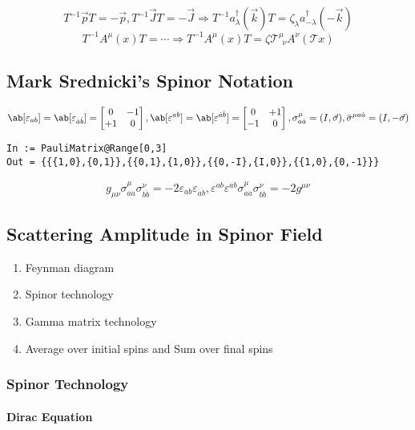 \documentclass{article}
\newcommand{\bmat}[1]{\begin{bmatrix}#1\end{bmatrix}}
\newcommand{\calT}{\mathcal{T}}
\newcommand{\veck}{\vec{k}}
\newcommand{\vecp}{\vec{p}}
\begin{document}
\[ T^{-1} \vecp T = - \vecp, T^{-1} \vec{J} T = - \vec{J} \Rightarrow T^{-1} a_\lambda^{\dagger}(\veck) T = \zeta_{\lambda} a_{- \lambda}^{\dagger}(- \veck) \]
\[ T^{-1} A^{\mu}(x) T = \cdots \Rightarrow T^{-1} A^{\mu}(x) T = \zeta \calT^{\mu}_{\ \ \nu} A^{\nu}(\calT x) \]

\subsection{Mark Srednicki's Spinor Notation}

\[ \ab[\varepsilon_{ab}] = \ab[\varepsilon_{\dot{a} \dot{b}}] = \bmat{0 & -1 \\ +1 & 0}, \ab[\varepsilon^{ab}] = \ab[\varepsilon^{\dot{a} \dot{b}}] = \bmat{0 & +1 \\ -1 & 0}, \sigma^{\mu}_{a \dot{a}} = (I, \vec{\sigma}), \bar{\sigma}^{\mu a \dot{a}} = (I, - \vec{\sigma}) \]
\begin{verbatim}
In := PauliMatrix@Range[0,3]
Out = {{{1,0},{0,1}},{{0,1},{1,0}},{{0,-I},{I,0}},{{1,0},{0,-1}}}
\end{verbatim}
\[ g_{\mu\nu} \sigma^{\mu}_{a \dot{a}} \sigma^{\nu}_{b \dot{b}} = - 2 \varepsilon_{ab} \varepsilon_{\dot{a} \dot{b}}, \varepsilon^{ab} \varepsilon^{\dot{a} \dot{b}} \sigma^{\mu}_{a \dot{a}} \sigma^{\nu}_{b \dot{b}} = - 2 g^{\mu \nu} \]

\subsection{Scattering Amplitude in Spinor Field}

\begin{enumerate}
    \item Feynman diagram
    \item Spinor technology
    \item Gamma matrix technology
    \item Average over initial spins and Sum over final spins
\end{enumerate}

\subsubsection{Spinor Technology}

\paragraph{Dirac Equation}
\end{document}

